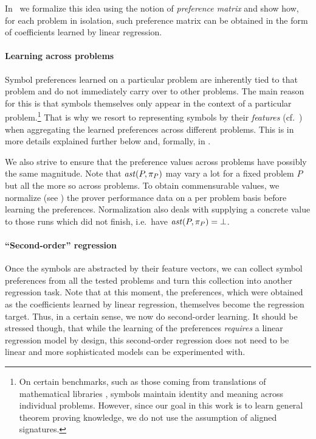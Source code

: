 \documentclass[a4paper]{easychair}
\begin{document}
In~ we formalize this idea using the notion of \emph{preference matrix}
and show how, for each problem in isolation, such preference matrix can be obtained in the form of coefficients learned by linear regression.

\paragraph{Learning across problems}
Symbol preferences learned on a particular problem are inherently tied to that problem
and do not immediately carry over to other problems. The main reason for this 
is that symbols themselves only appear in the context of a particular problem.\footnote{On certain benchmarks, such as those coming from translations of mathematical libraries \cite{KaliszykU13b},
symbols maintain identity and meaning across individual problems. However, since our goal in this work
is to learn general theorem proving knowledge, we do not use the assumption of aligned signatures.}
That is why we resort to representing symbols by their \emph{features} (cf.~)
when aggregating the learned preferences across different problems.
This is in more details explained further below and, formally, in .

We also strive to ensure that the preference values across problems have possibly the same magnitude.
Note that \(\operatorname{\mathit{ast}}(P,\pi_P)\) may vary a lot for a fixed problem \(P\) but all the more so across
problems. To obtain commensurable values, we normalize
(see ) the prover performance data
on a per problem basis before learning the preferences. Normalization also deals with
supplying a concrete value to those runs which did not finish, i.e.~have \(\operatorname{\mathit{ast}}(P,\pi_P) = \bot\).


\paragraph{``Second-order'' regression}
Once the symbols are abstracted by their feature vectors, we can collect symbol preferences from all the tested problems
and turn this collection into another regression task. 
Note that at this moment, the preferences, which were obtained as the coefficients learned by linear regression,
themselves become the regression target. Thus, in a certain sense, we now do second-order learning.
It should be stressed though, that while the learning of the preferences \emph{requires} a linear regression model by design,
this second-order regression does not need to be linear and more sophisticated models can be experimented with. 
\end{document}
